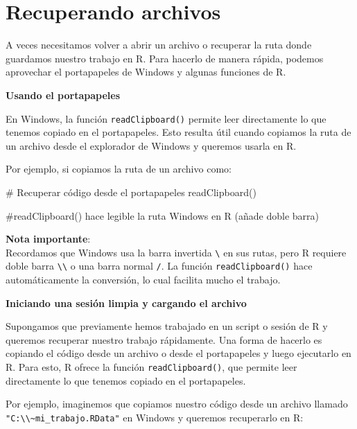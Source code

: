 \documentclass[
  letterpaper,
]{scrbook}
\newenvironment{Shaded}{\begin{snugshade}}{\end{snugshade}}
\newcommand{\CommentTok}[1]{\textcolor[rgb]{0.37,0.37,0.37}{#1}}
\newcommand{\FunctionTok}[1]{\textcolor[rgb]{0.28,0.35,0.67}{#1}}
\newcommand{\NormalTok}[1]{\textcolor[rgb]{0.00,0.23,0.31}{#1}}
\begin{document}
\hypertarget{recuperando-archivos}{%
\section{Recuperando archivos}\label{recuperando-archivos}}

A veces necesitamos volver a abrir un archivo o recuperar la ruta donde
guardamos nuestro trabajo en R. Para hacerlo de manera rápida, podemos
aprovechar el portapapeles de Windows y algunas funciones de R.

\textbf{Usando el portapapeles}

En Windows, la función \texttt{readClipboard()} permite leer
directamente lo que tenemos copiado en el portapapeles. Esto resulta
útil cuando copiamos la ruta de un archivo desde el explorador de
Windows y queremos usarla en R.

Por ejemplo, si copiamos la ruta de un archivo como:

\begin{Shaded}
\begin{Highlighting}[]
\CommentTok{\# Recuperar código desde el portapapeles}
\FunctionTok{readClipboard}\NormalTok{()}

\CommentTok{\#readClipboard() hace legible la ruta Windows en R (añade doble barra)}
\end{Highlighting}
\end{Shaded}

\textbf{Nota importante}:\\

Recordamos que Windows usa la barra invertida \texttt{\textbackslash{}}
en sus rutas, pero R requiere doble barra
\texttt{\textbackslash{}\textbackslash{}} o una barra normal \texttt{/}.
La función \texttt{readClipboard()} hace automáticamente la conversión,
lo cual facilita mucho el trabajo.

\textbf{Iniciando una sesión limpia y cargando el archivo}

Supongamos que previamente hemos trabajado en un script o sesión de R y
queremos recuperar nuestro trabajo rápidamente. Una forma de hacerlo es
copiando el código desde un archivo o desde el portapapeles y luego
ejecutarlo en R. Para esto, R ofrece la función
\texttt{readClipboard()}, que permite leer directamente lo que tenemos
copiado en el portapapeles.

Por ejemplo, imaginemos que copiamos nuestro código desde un archivo
llamado
\texttt{"C:\textbackslash{}\textbackslash{}\textasciitilde{}mi\_trabajo.RData"}
en Windows y queremos recuperarlo en R:
\end{document}

